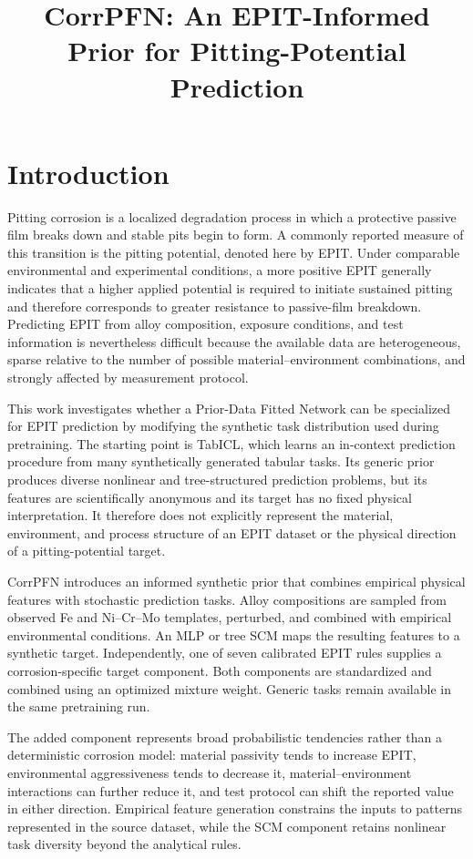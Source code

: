 \documentclass{article}
\title{CorrPFN: An EPIT-Informed Prior for Pitting-Potential Prediction}
\author{}
\date{}
\begin{document}
\maketitle

\section{Introduction}
\label{sec:introduction}

Pitting corrosion is a localized degradation process in which a protective
passive film breaks down and stable pits begin to form. A commonly reported
measure of this transition is the pitting potential, denoted here by EPIT.
Under comparable environmental and experimental conditions, a more positive
EPIT generally indicates that a higher applied potential is required to
initiate sustained pitting and therefore corresponds to greater resistance to
passive-film breakdown. Predicting EPIT from alloy composition, exposure
conditions, and test information is nevertheless difficult because the
available data are heterogeneous, sparse relative to the number of possible
material--environment combinations, and strongly affected by measurement
protocol.

This work investigates whether a Prior-Data Fitted Network can be specialized
for EPIT prediction by modifying the synthetic task distribution used during
pretraining. The starting point is TabICL, which learns an in-context
prediction procedure from many synthetically generated tabular tasks. Its
generic prior produces diverse nonlinear and tree-structured prediction
problems, but its features are scientifically anonymous and its target has no
fixed physical interpretation. It therefore does not explicitly represent the
material, environment, and process structure of an EPIT dataset or the
physical direction of a pitting-potential target.

CorrPFN introduces an informed synthetic prior that combines empirical
physical features with stochastic prediction tasks. Alloy compositions are
sampled from observed Fe and Ni--Cr--Mo templates, perturbed, and combined with
empirical environmental conditions. An MLP or tree SCM maps the resulting
features to a synthetic target. Independently, one of seven calibrated EPIT
rules supplies a corrosion-specific target component. Both components are
standardized and combined using an optimized mixture weight. Generic tasks
remain available in the same pretraining run.

The added component represents broad probabilistic tendencies rather than a
deterministic corrosion model: material passivity tends to increase EPIT,
environmental aggressiveness tends to decrease it, material--environment
interactions can further reduce it, and test protocol can shift the reported
value in either direction. Empirical feature generation constrains the inputs
to patterns represented in the source dataset, while the SCM component
retains nonlinear task diversity beyond the analytical rules.
\end{document}
